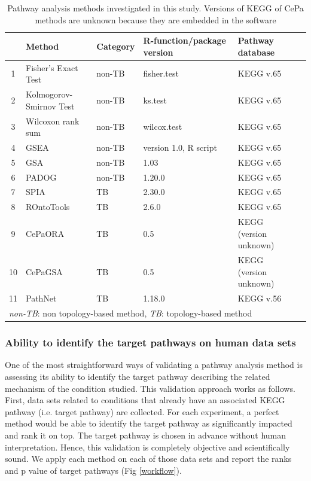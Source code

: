 \begin{table}
\centering
\caption{Pathway analysis methods investigated in this study. Versions of KEGG of CePa methods are unknown because they are embedded in the software\label{table:PAmethods}} 
\begin{tabular}{@{}clllll@{}}\hline
 & Method & Category  & R-function/package version & Pathway database \\\hline
 1 & Fisher's Exact Test &	non-TB 	& fisher.test & KEGG v.65\\ 
 2 & Kolmogorov-Smirnov Test& non-TB & ks.test & KEGG v.65\\
3 & Wilcoxon rank sum	& non-TB 	& wilcox.test &  KEGG v.65\\
4 & GSEA &	non-TB & version 1.0, R script & KEGG v.65\\
5 & GSA &	non-TB & 1.03 & KEGG v.65\\
6 & PADOG &	non-TB & 1.20.0 & KEGG v.65\\
7 & SPIA &	TB  & 2.30.0 & KEGG v.65\\
8 & ROntoTools &		TB & 2.6.0 & KEGG v.65\\
9 & CePaORA &	TB & 0.5 & KEGG (version unknown)\\
10 & CePaGSA &	TB & 0.5 & KEGG (version unknown)\\
11 & PathNet &	TB & 1.18.0 & KEGG v.56\\
\hline
\multicolumn{5}{l}{\textit{non-TB}: non topology-based method, \textit{TB}: topology-based method}

\end{tabular}
\end{table}


\subsubsection{Ability to identify the target pathways on human data sets}

One of the most straightforward ways of validating a pathway analysis method is assessing its ability to identify the target pathway describing the related mechanism of the condition studied. 
This validation approach works as follows. First, data sets related to  conditions that already have an associated KEGG pathway (i.e. target pathway) are collected. For each experiment, a perfect method would be able to identify the target pathway as significantly impacted and rank it on top. The target pathway is chosen in advance without human interpretation. Hence, this validation is completely objective and scientifically sound. We apply each method on each of those data sets and report the ranks and p value of target pathways (Fig \ref{workflow}).

